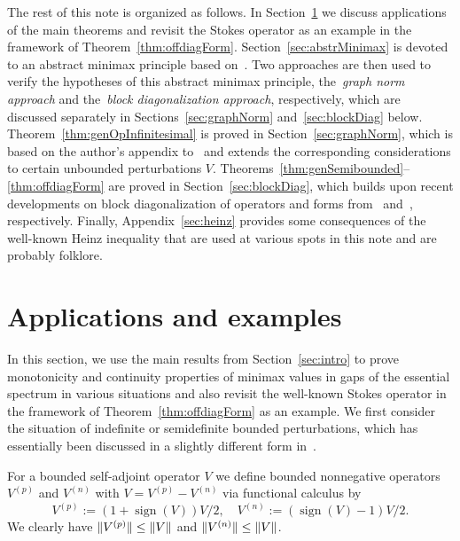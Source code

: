 \documentclass[11pt,a4paper]{amsart}
\numberwithin{equation}{section}
\DeclareMathOperator{\sign}{sign}
\DeclarePairedDelimiter{\norm}{\lVert}{\rVert}
\theoremstyle{plain}
\theoremstyle{definition}
\theoremstyle{remark}
\begin{document}
The rest of this note is organized as follows. In Section~\ref{sec:applications} we discuss applications of the main theorems and
revisit the Stokes operator as an example in the framework of Theorem~\ref{thm:offdiagForm}.
%
Section~\ref{sec:abstrMinimax} is devoted to an abstract minimax principle based on~\cite{GLS99}.
%
Two approaches are then used to verify the hypotheses of this abstract minimax principle, the~\emph{graph norm approach} and
the~\emph{block diagonalization approach}, respectively, which are discussed separately in Sections~\ref{sec:graphNorm}
and~\ref{sec:blockDiag} below.
%
Theorem~\ref{thm:genOpInfinitesimal} is proved in Section~\ref{sec:graphNorm}, which is based on the author's appendix
to~\cite{NSTTV18} and extends the corresponding considerations to certain unbounded perturbations $V$.
%
Theorems~\ref{thm:genSemibounded}--\ref{thm:offdiagForm} are proved in
Section~\ref{sec:blockDiag}, which builds upon recent developments on block diagonalization of operators and forms
from~\cite{MSS16} and~\cite{GKMSV17}, respectively.
%
Finally, Appendix~\ref{sec:heinz} provides some consequences of the well-known Heinz inequality that are used at various spots in
this note and are probably folklore.

\section{Applications and examples}\label{sec:applications}

In this section, we use the main results from Section~\ref{sec:intro} to prove monotonicity and continuity properties of minimax
values in gaps of the essential spectrum in various situations and also revisit the well-known Stokes operator in the framework
of Theorem~\ref{thm:offdiagForm} as an example. We first consider the situation of indefinite or semidefinite bounded
perturbations, which has essentially been discussed in a slightly different form in~\cite{NSTTV18}.

For a bounded self-adjoint operator $V$ we define bounded nonnegative operators $V^{(p)}$ and $V^{(n)}$ with
$V = V^{(p)} - V^{(n)}$ via functional calculus by
\begin{equation}\label{eq:defVpVn}
  V^{(p)} := (1 + \sign(V))V / 2
  ,\quad
  V^{(n)} := (\sign(V) - 1)V / 2
  .
\end{equation}
We clearly have $\norm{ V^{(p)} } \le \norm{V}$ and $\norm{ V^{(n)} } \le \norm{V}$.
\end{document}
